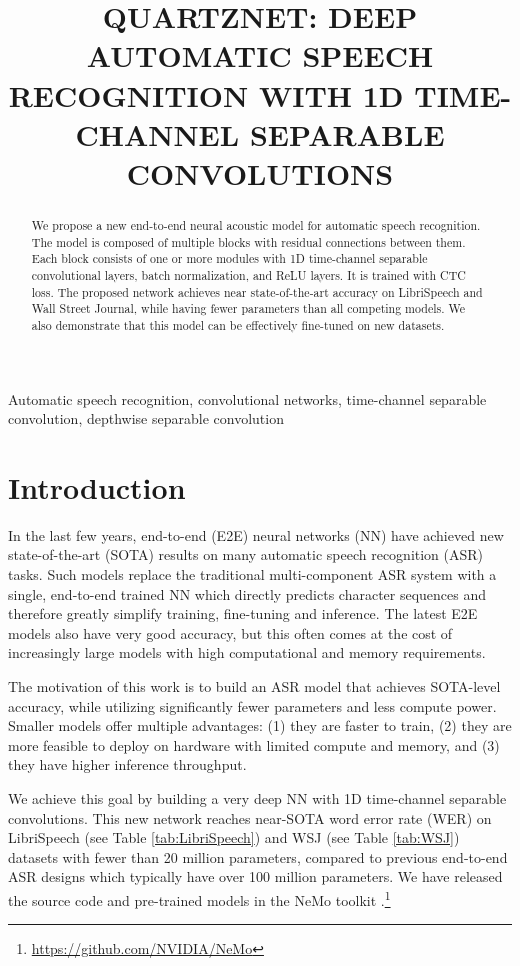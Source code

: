 \documentclass{article}
\title{QUARTZNET: DEEP AUTOMATIC SPEECH RECOGNITION WITH 1D TIME-CHANNEL SEPARABLE CONVOLUTIONS}
\begin{document}
\maketitle

\begin{abstract}
We propose a new end-to-end neural acoustic model for automatic speech recognition. The model is composed of multiple blocks with residual connections between them. Each block consists of one or more modules with 1D time-channel separable convolutional layers, batch normalization, and ReLU layers. It is trained with CTC loss. The proposed network achieves near state-of-the-art accuracy on LibriSpeech and Wall Street Journal, while having fewer parameters than all competing models. We also demonstrate that this model can be effectively fine-tuned on new datasets. 
\end{abstract}\begin{keywords}
Automatic speech recognition,  convolutional networks, time-channel separable convolution, depthwise separable convolution
\end{keywords}
\section{Introduction}
\label{sec:intro}

In the last few years, end-to-end (E2E) neural networks (NN) have achieved new state-of-the-art (SOTA) results on many automatic speech recognition (ASR) tasks. Such models replace the traditional multi-component ASR system with a single, end-to-end trained NN which directly predicts character sequences and therefore greatly simplify training, fine-tuning and inference. The latest E2E models also have very good accuracy, but this often comes at the cost of increasingly large models with high  computational and memory requirements.

The motivation of this work is to build an ASR model that achieves SOTA-level accuracy, while utilizing significantly fewer parameters and less compute power. Smaller models offer multiple advantages: (1) they are faster to train, (2) they are more feasible to deploy on hardware with limited compute and memory, and (3) they have higher inference throughput. 

We achieve this goal by building a very deep NN with 1D time-channel separable convolutions. This new network reaches near-SOTA word error rate (WER) on LibriSpeech \cite{panayotov2015librispeech} (see Table \ref{tab:LibriSpeech}) and WSJ \cite{wsj} (see Table \ref{tab:WSJ}) datasets with fewer than 20 million parameters, compared to previous end-to-end ASR designs which typically have  over 100 million parameters. We have released the source code and pre-trained models in the NeMo toolkit \cite{kuchaiev2019nemo}.\footnote{ \url{https://github.com/NVIDIA/NeMo}}
\end{document}
